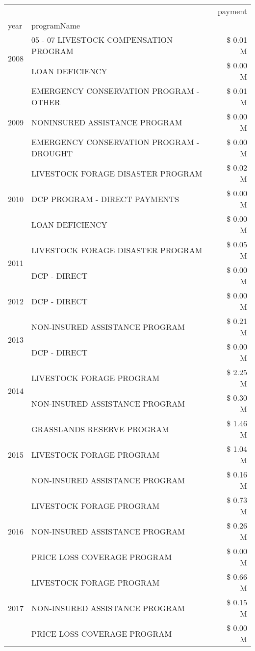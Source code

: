 \begin{tabular}{llr}
\toprule
 &  & payment \\
year & programName &  \\
\midrule
\multirow[t]{2}{*}{2008} & 05 - 07 LIVESTOCK COMPENSATION PROGRAM & \$ 0.01 M \\
 & LOAN DEFICIENCY & \$ 0.00 M \\
\cline{1-3}
\multirow[t]{3}{*}{2009} & EMERGENCY CONSERVATION PROGRAM - OTHER & \$ 0.01 M \\
 & NONINSURED ASSISTANCE PROGRAM & \$ 0.00 M \\
 & EMERGENCY CONSERVATION PROGRAM - DROUGHT & \$ 0.00 M \\
\cline{1-3}
\multirow[t]{3}{*}{2010} & LIVESTOCK FORAGE DISASTER  PROGRAM & \$ 0.02 M \\
 & DCP PROGRAM - DIRECT PAYMENTS & \$ 0.00 M \\
 & LOAN DEFICIENCY & \$ 0.00 M \\
\cline{1-3}
\multirow[t]{2}{*}{2011} & LIVESTOCK FORAGE DISASTER PROGRAM & \$ 0.05 M \\
 & DCP - DIRECT & \$ 0.00 M \\
\cline{1-3}
2012 & DCP - DIRECT & \$ 0.00 M \\
\cline{1-3}
\multirow[t]{2}{*}{2013} & NON-INSURED ASSISTANCE PROGRAM & \$ 0.21 M \\
 & DCP - DIRECT & \$ 0.00 M \\
\cline{1-3}
\multirow[t]{2}{*}{2014} & LIVESTOCK FORAGE PROGRAM & \$ 2.25 M \\
 & NON-INSURED ASSISTANCE PROGRAM & \$ 0.30 M \\
\cline{1-3}
\multirow[t]{3}{*}{2015} & GRASSLANDS RESERVE PROGRAM & \$ 1.46 M \\
 & LIVESTOCK FORAGE PROGRAM & \$ 1.04 M \\
 & NON-INSURED ASSISTANCE PROGRAM & \$ 0.16 M \\
\cline{1-3}
\multirow[t]{3}{*}{2016} & LIVESTOCK FORAGE PROGRAM                      & \$ 0.73 M \\
 & NON-INSURED ASSISTANCE PROGRAM                & \$ 0.26 M \\
 & PRICE LOSS COVERAGE PROGRAM                   & \$ 0.00 M \\
\cline{1-3}
\multirow[t]{3}{*}{2017} & LIVESTOCK FORAGE PROGRAM & \$ 0.66 M \\
 & NON-INSURED ASSISTANCE PROGRAM & \$ 0.15 M \\
 & PRICE LOSS COVERAGE PROGRAM & \$ 0.00 M \\

\end{tabular}
